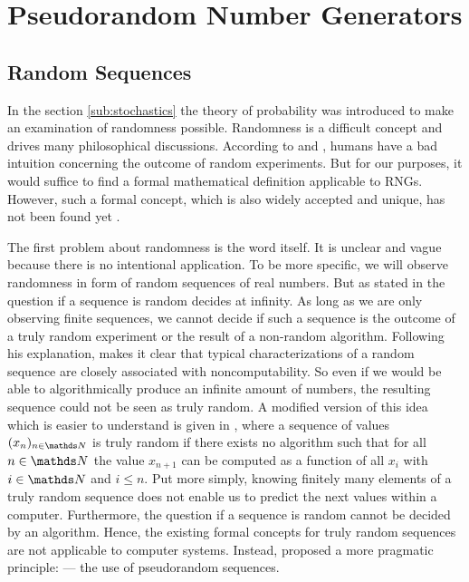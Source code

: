 \documentclass{stdlocal}
\begin{document}
\section{Pseudorandom Number Generators} %
\label{sec:pseudorandom_number_generators}
  \subsection{Random Sequences}
  In the section \ref{sub:stochastics} the theory of probability was introduced to make an examination of randomness possible.
  Randomness is a difficult concept and drives many philosophical discussions.
  According to \textcite{volchan2002} and \textcite[\ppno~10-11]{kneusel2018}, humans have a bad intuition concerning the outcome of random experiments.
  But for our purposes, it would suffice to find a formal mathematical definition applicable to RNGs.
  However, such a formal concept, which is also widely accepted and unique, has not been found yet \autocite{volchan2002}.

  The first problem about randomness is the word itself.
  It is unclear and vague because there is no intentional application.
  To be more specific, we will observe randomness in form of random sequences of real numbers.
  But as stated in \textcite{volchan2002} the question if a sequence is random decides at infinity.
  As long as we are only observing finite sequences, we cannot decide if such a sequence is the outcome of a truly random experiment or the result of a non-random algorithm.
  Following his explanation, \citeauthor{volchan2002} makes it clear that typical characterizations of a random sequence are closely associated with noncomputability.
  So even if we would be able to algorithmically produce an infinite amount of numbers, the resulting sequence could not be seen as truly random.
  A modified version of this idea which is easier to understand is given in \textcite{kneusel2018}, where a sequence of values $(x_n)_{n\in\setNatural}$ is truly random if there exists no algorithm such that for all $n\in\setNatural$ the value $x_{n+1}$ can be computed as a function of all $x_i$ with $i\in\setNatural$ and $i\leq n$.
  Put more simply, knowing finitely many elements of a truly random sequence does not enable us to predict the next values within a computer.
  Furthermore, the question if a sequence is random cannot be decided by an algorithm.
  Hence, the existing formal concepts for truly random sequences are not applicable to computer systems.
  Instead, \citeauthor{volchan2002} proposed a more pragmatic principle:  --- the use of pseudorandom sequences.
\end{document}
